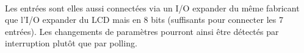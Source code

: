 \documentclass{article}
\begin{document}
    \paragraph{}
    Les entrées sont elles aussi connectées via un I/O expander du même fabricant que l'I/O expander du LCD mais en 8 bits (suffisants pour connecter les 7 entrées). Les changements de paramètres pourront ainsi être détectés par interruption plutôt que par polling.





    \newpage
\end{document}
